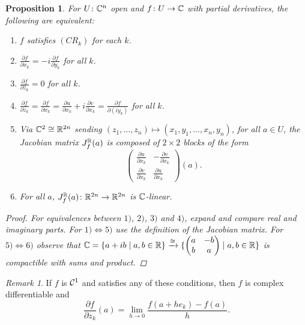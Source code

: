 \documentclass[A4paper, british, reqno]{amsart}
\theoremstyle{darkgreentheorem}
\newtheorem{prop}[thm]{Proposition}
\theoremstyle{darkbluedefinition}
\theoremstyle{darkredexample}
\theoremstyle{remark}
\newtheorem{rem}[thm]{Remark}
\newcommand{\1}{\mathbbm{1}}
\begin{document}
\begin{prop}
    For $U\colon \mathbb{C}^{n}$ open and $f\colon U\to \mathbb{C}$ with partial derivatives, the following are equivalent:
    \begin{enumerate}[label=\arabic*)]
	\item $f$ satisfies $(CR_{k})$ for each $k$.
	\item $\frac{\partial f}{\partial x_{k}}=-i\frac{\partial f}{\partial y_{k}}$ for all $k$.
	\item $\frac{\partial f}{\partial \bar{z}_{k}}=0$ for all $k$.
	\item $\frac{\partial f}{\partial z_{k}}=\frac{\partial f}{\partial x_{k}}=\frac{\partial u}{\partial x_{k}}+i\frac{\partial v}{\partial x_{k}}=\frac{\partial f}{\partial (iy_{k})}$ for all $k$.
	\item Via $\mathbb{C}^{2}\cong \mathbb{R}^{2n}$ sending $(z_{1},\ldots,z_{n})\mapsto (x_{1},y_{1},\ldots, x_{n},y_{n})$, for all $a\in U$, the Jacobian matrix  $J_{f}^{\mathbb{R}}(a)$ is composed of $2\times 2$ blocks of the form
	    \[ \begin{pmatrix} \frac{\partial u}{\partial x_{k}} & -\frac{\partial v}{\partial x_{k}} \\ \frac{\partial v}{\partial x_{k}} & \frac{\partial u}{\partial x_{k}}
	    \end{pmatrix}(a).\]
	\item For all $a$, $J_{f}^{\mathbb{R}}(a)\colon \mathbb{R}^{2n}\to \mathbb{R}^{2n}$ is $\mathbb{C}$-linear.
    \end{enumerate}
    \begin{proof}
	For equivalences between $1)$, $2)$, $3)$ and $4)$, expand and compare real and imaginary parts.
	For $1)\Leftrightarrow 5)$ use the definition of the Jacobian matrix.
	For $5)\Leftrightarrow 6)$ observe that $\mathbb{C}=\{a+ib\mid a,b\in \mathbb{R}\} \xrightarrow{\cong} \{ \begin{pmatrix} a & -b \\ b & a \end{pmatrix} \mid a,b\in \mathbb{R}\}$ is compactible with sums and product.
    \end{proof}
\end{prop}

\begin{rem}
    If $f$ is $\mathcal{C}^{1}$ and satisfies any of these conditions, then $f$ is complex differentiable and
    \[ \frac{\partial f}{\partial z_{k}}(a)=\lim_{h\to 0}\frac{f(a+he_{k})-f(a)}{h}.\]
\end{rem}
\end{document}
